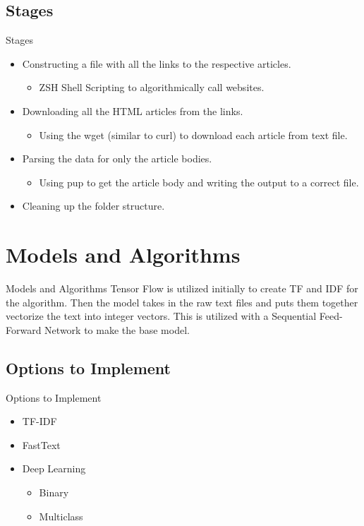 \documentclass{beamer}
\begin{document}
\subsection{Stages}
\begin{frame}{Stages}
	\begin{itemize}
		\item<1-> Constructing a file with all the links to the respective articles.
			\begin{itemize}
				\item ZSH Shell Scripting to algorithmically call websites.
			\end{itemize}
		\item<2-> Downloading all the HTML articles from the links.
			\begin{itemize}
				\item Using the wget (similar to curl) to download each article from text file.
			\end{itemize}
		\item<3-> Parsing the data for only the article bodies.
			\begin{itemize}
				\item Using pup to get the article body and writing the output to a correct file.
			\end{itemize}
		\item<4-> Cleaning up the folder structure.
	\end{itemize}
\end{frame}

\section{Models and Algorithms}
\begin{frame}{Models and Algorithms}
	Tensor Flow is utilized initially to create TF and IDF for the algorithm.
	Then the model takes in the raw text files and puts them together vectorize the text into integer vectors.
	This is utilized with a Sequential Feed-Forward Network to make the base model.
\end{frame}

\subsection{Options to Implement}
\begin{frame}{Options to Implement}
	\begin{itemize}
		\item<1-> TF-IDF
		\item<2-> FastText
		\item<3-> Deep Learning
			\begin{itemize}
				\item Binary
				\item Multiclass
			\end{itemize}
	\end{itemize}
\end{frame}
\end{document}
